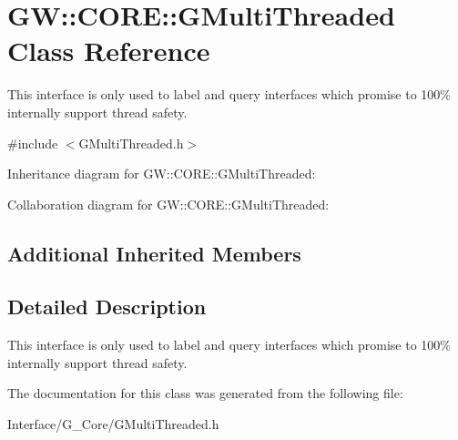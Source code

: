 \hypertarget{classGW_1_1CORE_1_1GMultiThreaded}{}\section{GW\+:\+:C\+O\+RE\+:\+:G\+Multi\+Threaded Class Reference}
\label{classGW_1_1CORE_1_1GMultiThreaded}


This interface is only used to label and query interfaces which promise to 100\% internally support thread safety.  




{\ttfamily \#include $<$G\+Multi\+Threaded.\+h$>$}



Inheritance diagram for GW\+:\+:C\+O\+RE\+:\+:G\+Multi\+Threaded\+:


Collaboration diagram for GW\+:\+:C\+O\+RE\+:\+:G\+Multi\+Threaded\+:
\subsection*{Additional Inherited Members}


\subsection{Detailed Description}
This interface is only used to label and query interfaces which promise to 100\% internally support thread safety. 

The documentation for this class was generated from the following file\+:\begin{DoxyCompactItemize}
\item 
Interface/\+G\+\_\+\+Core/G\+Multi\+Threaded.\+h\end{DoxyCompactItemize}
